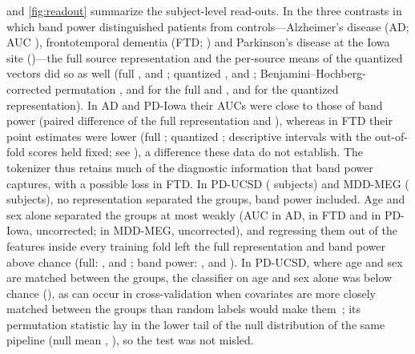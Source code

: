 \documentclass[10pt,letterpaper]{article}
\begin{document}
 and \cref{fig:readout} summarize the subject-level read-outs. In the three
contrasts in which band power distinguished patients from controls---Alzheimer's disease (AD; AUC
\BandADAUC), frontotemporal dementia (FTD; \BandFTDAUC) and Parkinson's disease at the Iowa site
(\BandIowaPDAUC)---the full source representation and the per-source means of the quantized vectors
did so as well (full \FullADAUC, \FullFTDAUC{} and \FullIowaPDAUC; quantized \QuantADAUC,
\QuantFTDAUC{} and \QuantIowaPDAUC; Benjamini--Hochberg-corrected permutation \FullADP, \FullFTDP{} and
\FullIowaPDP{} for the full and \QuantADP, \QuantFTDP{} and \QuantIowaPDP{} for the quantized representation). In AD and PD-Iowa their AUCs
were close to those of band power (paired difference of the full representation
\PairedFullBandAD{} \PairedFullBandADCI{} and \PairedFullBandIowaPD{} \PairedFullBandIowaPDCI), whereas
in FTD their point estimates were lower (full \PairedFullBandFTD{} \PairedFullBandFTDCI; quantized
\PairedQuantBandFTD{} \PairedQuantBandFTDCI; descriptive intervals with the out-of-fold scores held
fixed; see ), a difference these data do not establish. The tokenizer thus retains much of the diagnostic information that band power captures,
with a possible loss in FTD. In PD-UCSD (\NUCSDPD{} subjects) and MDD-MEG (\NMDD{} subjects), no representation
separated the groups, band power included. Age and sex alone separated the groups at most weakly
(AUC \AgeSexADAUC{} in AD, \AgeSexFTDAUC{} in FTD and \AgeSexIowaPDAUC{} in PD-Iowa,
\AgeSexIowaPDP{} uncorrected; \AgeSexMDDAUC{} in MDD-MEG, \AgeSexMDDP{} uncorrected), and regressing
them out of the features inside every training fold left the full representation and band power
above chance (full: \FullAdjADAUC, \FullAdjFTDAUC{} and \FullAdjIowaPDAUC; band power:
\BandAdjADAUC, \BandAdjFTDAUC{} and \BandAdjIowaPDAUC). In PD-UCSD, where age and sex are matched
between the groups, the classifier on age and sex alone was below chance (\AgeSexUCSDPDAUC), as can
occur in cross-validation when covariates are more closely matched between the groups than random
labels would make them~\cite{parker2007stratification,airola2011auc}; its permutation statistic lay
in the lower tail of the null distribution of the same pipeline (null mean \AgeSexUCSDPDNullMean,
\AgeSexUCSDPDP), so the test was not misled.


\end{document}
